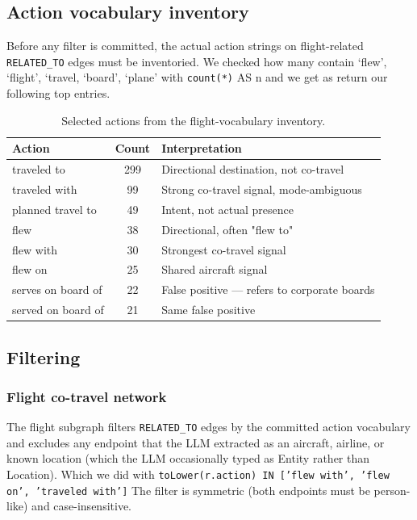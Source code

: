 \subsection{Action vocabulary inventory}
Before any filter is committed, the actual action strings on flight-related \texttt{RELATED\_TO} edges must be inventoried. We checked how many contain ‘flew’, ‘flight’, ‘travel, ‘board’,  ‘plane’  with \texttt{count(*)} AS n and we get as return our following top entries.
\begin{table}[H]
    \centering
    \begin{tabular}{l c l}
        \toprule
        Action & Count & Interpretation \\
        \midrule
            traveled to & 299 & Directional destination, not co-travel \\
            traveled with & 99 & Strong co-travel signal, mode-ambiguous \\
            planned travel to & 49 & Intent, not actual presence \\
            flew & 38 & Directional, often "flew to" \\
            flew with & 30 & Strongest co-travel signal \\
            flew on & 25 & Shared aircraft signal \\
            serves on board of & 22 & False positive — refers to corporate boards \\
            served on board of & 21 & Same false positive \\
        \bottomrule
    \end{tabular}
    \caption{Selected actions from the flight-vocabulary inventory.}
    \label{tab:flight_vocabulary}
\end{table}
\subsection{Filtering}
\subsubsection{Flight co-travel network}
The flight subgraph filters \texttt{RELATED\_TO} edges by the committed action vocabulary and excludes any endpoint that the LLM extracted as an aircraft, airline, or known location (which the LLM occasionally typed as Entity rather than Location). Which we did with \texttt{toLower(r.action) IN ['flew with', 'flew on', 'traveled with']} The filter is symmetric (both endpoints must be person-like) and case-insensitive.
